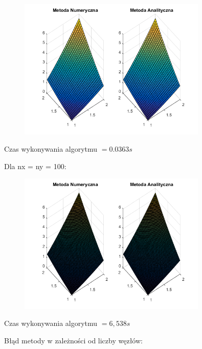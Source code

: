\begin{figure}[!ht]
	\begin{center}
		\includegraphics[width=0.8\textwidth]{Lab5/charts/zad3/30x30.png}
	\end{center}
\end{figure}

Czas wykonywania algorytmu $ = 0.0363 s$

Dla nx = ny = 100:

\begin{figure}[!ht]
	\begin{center}
		\includegraphics[width=0.8\textwidth]{Lab5/charts/zad3/100x100.png}
	\end{center}
\end{figure}

Czas wykonywania algorytmu $ = 6,538 s$

\newpage

Błąd metody w zależności od liczby węzłów:


